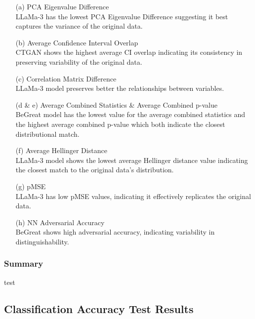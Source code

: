 \begin{enumerate}
    \item[(a)] PCA Eigenvalue Difference \\
    LLaMa-3 has the lowest PCA Eigenvalue Difference suggesting it best captures the variance of the original data. 

    \item[(b)] Average Confidence Interval Overlap \\
    CTGAN shows the highest average CI overlap indicating its consistency in preserving variability of the original data.

    \item[(c)] Correlation Matrix Difference \\
    LLaMa-3 model preserves better the relationships between variables.

    \item[(d \& e)] Average Combined Statistics \& Average Combined p-value \\
    BeGreat model has the lowest value for the average combined statistics and the highest average combined p-value which both indicate the closest distributional match.

    \item[(f)] Average Hellinger Distance \\
    LLaMa-3 model shows the lowest average Hellinger distance value indicating the closest match to the original data’s distribution.

    \item[(g)] pMSE \\
    LLaMa-3 has low pMSE values, indicating it effectively replicates the original data.

    \item[(h)] NN Adversarial Accuracy \\
    BeGreat shows high adversarial accuracy, indicating variability in distinguishability.
\end{enumerate}

\subsubsection{Summary}

test



\subsection{Classification Accuracy Test Results}




